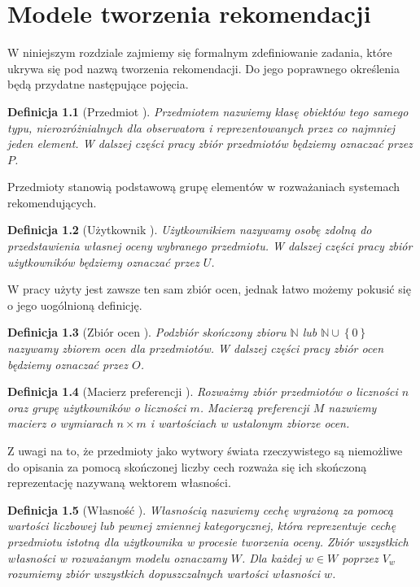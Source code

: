 \documentclass[12pt,a4paper]{report}
\newtheorem{df}{Definicja}[chapter]
\newcommand{\set}[1]{\left\lbrace {#1} \right\rbrace}
\newcommand{\setN}{\mathbb{N}}
\newcommand{\setUzytkownicy}{\mathit{U}}
\newcommand{\setPrzedmioty}{\mathit{P}}
\newcommand{\setOceny}{\mathit{O}}
\newcommand{\setWlasnosci}{\mathit{W}}
\begin{document}
\chapter{Modele tworzenia rekomendacji}

W niniejszym rozdziale zajmiemy się formalnym zdefiniowanie zadania, które ukrywa się pod nazwą tworzenia rekomendacji. Do jego poprawnego określenia będą przydatne następujące pojęcia.

\begin{df}[Przedmiot {\citep[Sec 1.3]{kidzinski}}]
 Przedmiotem nazwiemy klasę obiektów tego samego typu, nierozróżnialnych dla obserwatora i reprezentowanych przez co najmniej jeden element. W dalszej części pracy zbiór przedmiotów będziemy oznaczać przez $\setPrzedmioty$.
\end{df}

Przedmioty stanowią podstawową grupę elementów w rozważaniach systemach rekomendujących. 

\begin{df}[Użytkownik {\citep[Sec 1.3]{kidzinski}}]
Użytkownikiem nazywamy osobę zdolną do przedstawienia własnej oceny wybranego przedmiotu. W dalszej części pracy zbiór użytkowników będziemy oznaczać przez $\setUzytkownicy$.
\end{df}

W pracy \citep{kidzinski} użyty jest zawsze ten sam zbiór ocen, jednak łatwo możemy pokusić się o jego uogólnioną definicję.

\begin{df}[Zbiór ocen {\citep[Sec 1.3]{kidzinski}}]
Podzbiór skończony zbioru $\setN$ lub $\setN \cup \set{0}$ nazywamy zbiorem ocen dla przedmiotów. W dalszej części pracy zbiór ocen będziemy oznaczać przez $\setOceny$.
\end{df} 

\begin{df}[Macierz preferencji {\citep[Sec 1.3]{kidzinski}}]
Rozważmy zbiór przedmiotów o liczności $n$ oraz grupę użytkowników o liczności $m$. Macierzą preferencji $M$ nazwiemy macierz o wymiarach $n \times m$ i wartościach w ustalonym zbiorze ocen.
\end{df}

Z uwagi na to, że przedmioty jako wytwory świata rzeczywistego są niemożliwe do opisania za pomocą skończonej liczby cech  rozważa się ich skończoną reprezentację nazywaną wektorem własności.

\begin{df}[Własność {\citep[Sec 1.3]{kidzinski}}]
Własnością nazwiemy cechę wyrażoną za pomocą wartości liczbowej lub pewnej zmiennej kategorycznej, która reprezentuje cechę przedmiotu istotną dla użytkownika w procesie tworzenia oceny. Zbiór wszystkich własności w rozważanym modelu oznaczamy $\setWlasnosci$. Dla każdej $w \in \setWlasnosci$ poprzez $V_w$ rozumiemy zbiór wszystkich dopuszczalnych wartości własności $w$.
\end{df}
\end{document}
